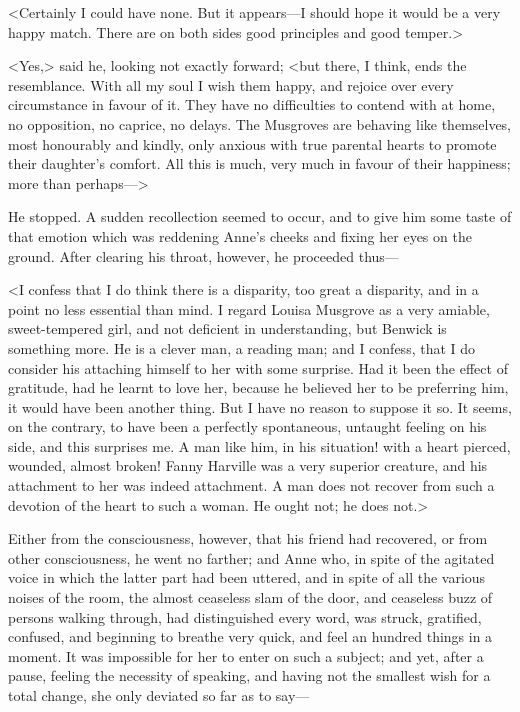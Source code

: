 <Certainly I could have none. But it appears—I should hope it would be a very happy match. There are on both sides good principles and good temper.>

<Yes,> said he, looking not exactly forward; <but there, I think, ends the resemblance. With all my soul I wish them happy, and rejoice over every circumstance in favour of it. They have no difficulties to contend with at home, no opposition, no caprice, no delays. The Musgroves are behaving like themselves, most honourably and kindly, only anxious with true parental hearts to promote their daughter's comfort. All this is much, very much in favour of their happiness; more than perhaps—>

He stopped. A sudden recollection seemed to occur, and to give him some taste of that emotion which was reddening Anne's cheeks and fixing her eyes on the ground. After clearing his throat, however, he proceeded thus—

<I confess that I do think there is a disparity, too great a disparity, and in a point no less essential than mind. I regard Louisa Musgrove as a very amiable, sweet-tempered girl, and not deficient in understanding, but Benwick is something more. He is a clever man, a reading man; and I confess, that I do consider his attaching himself to her with some surprise. Had it been the effect of gratitude, had he learnt to love her, because he believed her to be preferring him, it would have been another thing. But I have no reason to suppose it so. It seems, on the contrary, to have been a perfectly spontaneous, untaught feeling on his side, and this surprises me. A man like him, in his situation! with a heart pierced, wounded, almost broken! Fanny Harville was a very superior creature, and his attachment to her was indeed attachment. A man does not recover from such a devotion of the heart to such a woman. He ought not; he does not.>

Either from the consciousness, however, that his friend had recovered, or from other consciousness, he went no farther; and Anne who, in spite of the agitated voice in which the latter part had been uttered, and in spite of all the various noises of the room, the almost ceaseless slam of the door, and ceaseless buzz of persons walking through, had distinguished every word, was struck, gratified, confused, and beginning to breathe very quick, and feel an hundred things in a moment. It was impossible for her to enter on such a subject; and yet, after a pause, feeling the necessity of speaking, and having not the smallest wish for a total change, she only deviated so far as to say—

